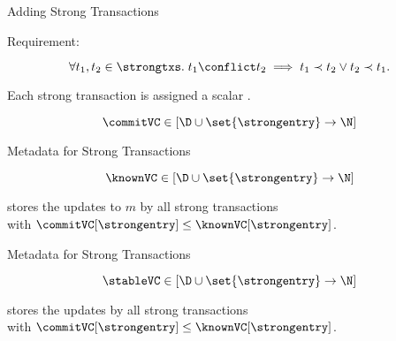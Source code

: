 
\begin{frame}{}
  \begin{center}
    {\Large Adding Strong Transactions}
  \end{center}
\end{frame}

\begin{frame}{Requirement: \conflictaxiom}
  \begin{center}
    \[
       \forall t_{1}, t_{2} \in \strongtxs.\;
       t_{1} \conflict t_{2} \implies t_{1} \prec t_{2} \lor t_{2} \prec t_{1}.
    \]

    Each strong transaction is assigned a scalar .

    \[
      \commitVC \in [\D \cup \set{\strongentry} \to \N]
    \]
  \end{center}
\end{frame}

\begin{frame}{Metadata for Strong Transactions}
  \begin{center}
    \[
      \knownVC \in [\D \cup \set{\strongentry} \to \N]
    \]

    \begin{property}
      \begin{center}
         stores the updates to $m$ by all strong transactions \\[3pt]
        with $\commitVC[\strongentry] \le \knownVC[\strongentry]$.
      \end{center}
    \end{property}
  \end{center}
\end{frame}

\begin{frame}{Metadata for Strong Transactions}
  \begin{center}
    \[
      \stableVC \in [\D \cup \set{\strongentry} \to \N]
    \]


    \begin{property}
      \begin{center}
         stores the updates by all strong transactions \\[3pt]
        with $\commitVC[\strongentry] \le \knownVC[\strongentry]$.
      \end{center}
    \end{property}
  \end{center}
\end{frame}

